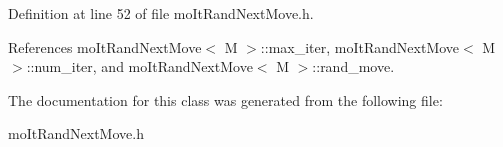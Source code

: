 Definition at line 52 of file mo\-It\-Rand\-Next\-Move.h.

References mo\-It\-Rand\-Next\-Move$<$ M $>$::max\_\-iter, mo\-It\-Rand\-Next\-Move$<$ M $>$::num\_\-iter, and mo\-It\-Rand\-Next\-Move$<$ M $>$::rand\_\-move.

The documentation for this class was generated from the following file:\begin{CompactItemize}
\item 
mo\-It\-Rand\-Next\-Move.h\end{CompactItemize}
